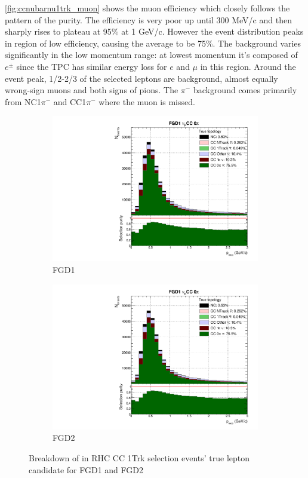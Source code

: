 \autoref{fig:ccnubarnu1trk_muon} shows the muon efficiency which closely follows the pattern of the purity. The efficiency is very poor up until 300 MeV/c and then sharply rises to plateau at 95\% at 1 GeV/c. However the event distribution peaks in region of low efficiency, causing the average to be 75\%. The background varies significantly in the low momentum range: at lowest momentum it's composed of $e^\pm$ since the TPC has similar energy loss for $e$ and $\mu$ in this region. Around the event peak, 1/2-2/3 of the selected leptons are background, almost equally wrong-sign muons and both signs of pions. The $\pi^-$ background comes primarily from NC1$\pi^-$ and \numubar CC1$\pi^-$ where the muon is missed.
\begin{figure}[h]
	\begin{subfigure}[t]{0.49\textwidth}
		\includegraphics[width=\textwidth,page=22, trim={0mm 0mm 0mm 9mm}, clip]{figures/mach3/selection/2017b_Diag_WithSelection}
		\caption{FGD1}
	\end{subfigure}
	\begin{subfigure}[t]{0.49\textwidth}
		\includegraphics[width=\textwidth,page=26, trim={0mm 0mm 0mm 9mm}, clip]{figures/mach3/selection/2017b_Diag_WithSelection}
		\caption{FGD2}
	\end{subfigure}
	\caption{Breakdown of \numu in RHC CC 1Trk selection events' true lepton candidate for FGD1 and FGD2 }
	\label{fig:ccnubarnu1trk_muon}
\end{figure}

